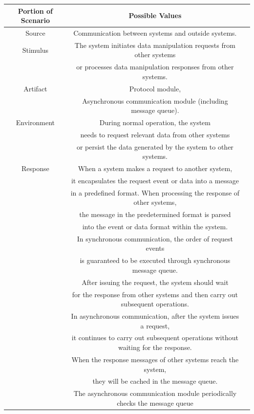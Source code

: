 \documentclass{article}
\begin{document}
	\begin{center}
		\begin{table}[!htb]
		\begin{tabular}{ccc}
		\toprule  
		Portion of Scenario & Possible Values\\
		\midrule 
		Source & Communication between systems and outside systems.\\
		Stimulus & The system initiates data manipulation requests from other systems \\
		& or processes data manipulation responses from other systems.\\
		Artifact & Protocol module, \\
		& Asynchronous communication module (including message queue).\\
		Environment & During normal operation, the system \\
		& needs to request relevant data from other systems \\
		& or persist the data generated by the system to other systems.\\
		Response & When a system makes a request to another system, \\
		& it encapsulates the request event or data into a message \\
		& in a predefined format. When processing the response of other systems, \\
		& the message in the predetermined format is parsed \\
		& into the event or data format within the system. \\
		& In synchronous communication, the order of request events \\
		& is guaranteed to be executed through synchronous message queue. \\
		& After issuing the request, the system should wait \\
		& for the response from other systems and then carry out subsequent operations. \\
		& In asynchronous communication, after the system issues a request, \\
		& it continues to carry out subsequent operations without waiting for the response. \\
		& When the response messages of other systems reach the system, \\
		& they will be cached in the message queue. \\
		& The asynchronous communication module periodically checks the message queue \\

\end{tabular}
\end{table}
\end{center}
\end{document}
